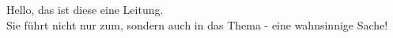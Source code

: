 Hello, das ist diese eine Leitung.\\
Sie führt nicht nur zum, sondern auch in das Thema - eine wahnsinnige Sache!
